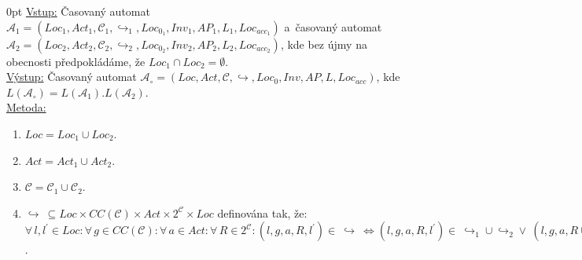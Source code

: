 \documentclass[a4paper, 11pt]{scrartcl}
\begin{document}
    \begin{addmargin}[10pt]{0pt}
        \underline{Vstup:}
            Časovaný automat $ \mathcal{A}_1 = (Loc_1, Act_1, \mathcal{C}_1,
            \hookrightarrow_1, Loc_{0_1}, Inv_1, AP_1, L_1, Loc_{acc_1}) $
            a~časovaný automat $ \mathcal{A}_2 = (Loc_2, Act_2, \mathcal{C}_2,
            \hookrightarrow_2, Loc_{0_2}, Inv_2, AP_2, L_2, Loc_{acc_2}) $, kde
            bez újmy na obecnosti předpokládáme, že $ Loc_1 \cap Loc_2 =
            \emptyset $.
        \\[5pt]
        \underline{Výstup:}
            Časovaný automat $ \mathcal{A}_\circ = (Loc, Act, \mathcal{C},
            \hookrightarrow, Loc_0, Inv, AP, L, Loc_{acc}) $, kde
            $ L(\mathcal{A}_\circ) = L(\mathcal{A}_1) . L(\mathcal{A}_2) $.
        \\[5pt]
        \underline{Metoda:}
            \begin{enumerate}
                \item
                    $ Loc = Loc_1 \cup Loc_2 $.

                \item
                    $ Act = Act_1 \cup Act_2 $.

                \item
                    $ \mathcal{C} = \mathcal{C}_1 \cup \mathcal{C}_2 $.

                \item
                    $ \hookrightarrow\ \subseteq Loc \times CC(\mathcal{C})
                    \times Act \times 2^\mathcal{C} \times Loc $ definována
                    tak, že: $ \forall\,l, l^\prime \in Loc : \forall\,g
                    \in CC(\mathcal{C}) : \forall\,a \in Act : \forall\,R
                    \in 2^\mathcal{C} : (l, g, a, R, l^\prime) \in
                    \ \hookrightarrow\ \Leftrightarrow (l, g, a, R, l^\prime)
                    \in\ \hookrightarrow_1 \cup \hookrightarrow_2 \vee
                    \ (l, g, a, R \cup \mathcal{C}, l^\prime) \in
                    \ \hookrightarrow\ \Leftrightarrow
                    (\exists\,l^{\prime\prime} \in Loc_{acc_1} : (l, g, a, R,
                    l^{\prime\prime}) \in\ \hookrightarrow_1 \wedge
                    \ \exists\,l^{\prime\prime\prime} \in Loc_2 :
                    \exists\,g^\prime \in CC(\mathcal{C}) : \exists\,a^\prime
                    \in Act : \exists\,R^\prime \in 2^\mathcal{C} :
                    (l^{\prime}, g^\prime, a^\prime, R^\prime,
                    l^{\prime\prime\prime}) \in\ \hookrightarrow_2 \wedge
                    \ l^\prime \in Loc_{0_2}) $.


\end{enumerate}
\end{addmargin}
\end{document}
